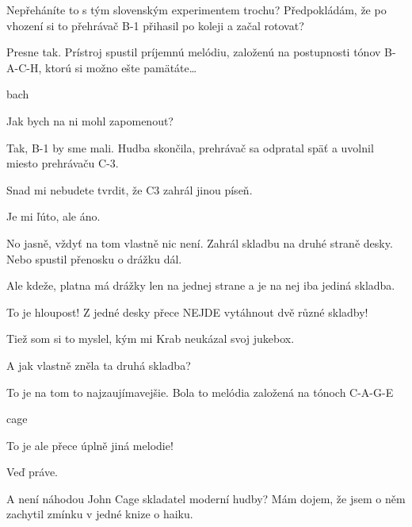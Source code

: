 \documentclass[12pt]{article}
\begin{document}
\begin{description}[itemsep=0pt]
\item[A:] Nepřeháníte to s tým slovenským experimentem trochu? Předpokládám, že po 
    vhození si to přehrávač B-1 přihasil po koleji
    a začal rotovat?

\item[Ž:] Presne tak. Prístroj spustil príjemnú melódiu, založenú na postupnosti 
    tónov B-A-C-H, ktorú si možno ešte pamätáte\dots
    
\item[melodia] bach

\item[A:] Jak bych na ni mohl zapomenout?

\item[Ž:] Tak, B-1 by sme mali. Hudba skončila, prehrávač sa odpratal späť a 
    uvolnil miesto prehrávaču C-3.

\item[A:] Snad mi nebudete tvrdit, že C3 zahrál jinou píseň.

\item[Ž:] Je mi ľúto, ale áno.

\item[A:] No jasně, vždyť na tom vlastně nic není. Zahrál skladbu na druhé straně desky.
    Nebo spustil přenosku o drážku dál.

\item[Ž:] Ale kdeže, platna má drážky len na jednej strane a je na nej iba jediná skladba.

\item[A:] To je hloupost! Z jedné desky přece NEJDE vytáhnout dvě různé skladby!

\item[Ž:] Tiež som si to myslel, kým mi Krab neukázal svoj jukebox.

\item[A:] A jak vlastně zněla ta druhá skladba?

\item[Ž:] To je na tom to najzaujímavejšie. Bola to melódia založená na tónoch C-A-G-E

\item[melodia] cage

\item[A:] To je ale přece úplně jiná melodie!

\item[Ž:] Veď práve.

\item[A:] A není náhodou John Cage skladatel moderní hudby? Mám dojem, že jsem o něm
    zachytil zmínku v jedné knize o haiku.


\end{description}
\end{document}
